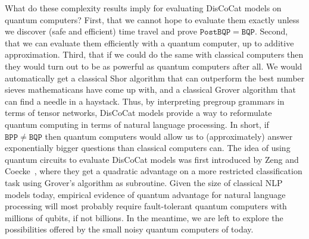 What do these complexity results imply for evaluating DisCoCat models on quantum computers?
First, that we cannot hope to evaluate them exactly unless we discover (safe and efficient) time travel and prove $\mathtt{PostBQP} = \mathtt{BQP}$.
Second, that we can evaluate them efficiently with a quantum computer, up to additive approximation.
Third, that if we could do the same with classical computers then they would turn out to be as powerful as quantum computers after all.
We would automatically get a classical Shor algorithm that can outperform the best number sieves mathematicans have come up with, and a classical Grover algorithm that can find a needle in a haystack.
Thus, by interpreting pregroup grammars in terms of tensor networks, DisCoCat models provide a way to reformulate quantum computing in terms of natural language processing.
In short, if $\mathtt{BPP} \neq \mathtt{BQP}$ then quantum computers would allow us to (approximately) answer exponentially bigger questions than classical computers can.
The idea of using quantum circuits to evaluate DisCoCat models was first introduced by Zeng and Coecke~\cite{ZengCoecke16}, where they get a quadratic advantage on a more restricted classification task using Grover's algorithm as subroutine.
Given the size of classical NLP models today, empirical evidence of quantum advantage for natural language processing will most probably require fault-tolerant quantum computers with millions of qubits, if not billions.
In the meantime, we are left to explore the possibilities offered by the small noisy quantum computers of today.
